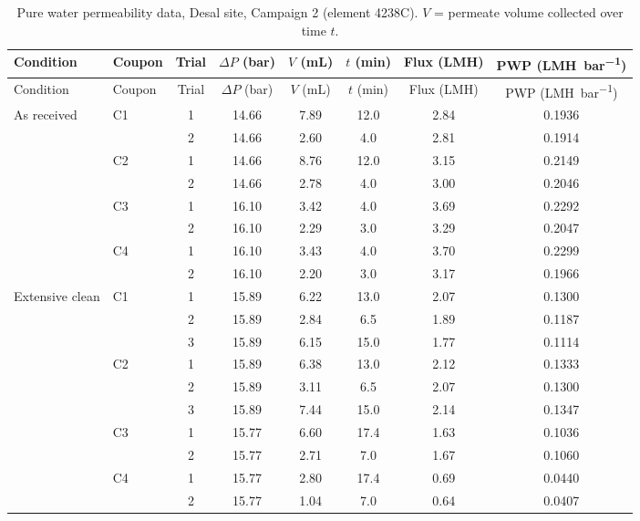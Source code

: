 {\footnotesize\setlength{\tabcolsep}{4pt}
\begin{longtable}{llcccccc}
  \caption{Pure water permeability data, Desal site, Campaign 2 (element 4238C). $V$ = permeate volume collected over time $t$.}
  \label{tab:app-c2-desal-pwp}\\
  \toprule
  Condition & Coupon & Trial & $\Delta P$ (\unit{bar}) & $V$ (\unit{mL}) & $t$ (\unit{min}) & Flux (\unit{LMH}) & PWP (\unit{LMH.bar^{-1}}) \\
  \midrule
  \endfirsthead
  \toprule
  Condition & Coupon & Trial & $\Delta P$ (\unit{bar}) & $V$ (\unit{mL}) & $t$ (\unit{min}) & Flux (\unit{LMH}) & PWP (\unit{LMH.bar^{-1}}) \\
  \midrule
  \endhead
    As received & C1 & 1 & 14.66 & 7.89 & 12.0 & 2.84 & 0.1936 \\
     &  & 2 & 14.66 & 2.60 & 4.0 & 2.81 & 0.1914 \\
    \addlinespace[2pt]
     & C2 & 1 & 14.66 & 8.76 & 12.0 & 3.15 & 0.2149 \\
     &  & 2 & 14.66 & 2.78 & 4.0 & 3.00 & 0.2046 \\
    \addlinespace[2pt]
     & C3 & 1 & 16.10 & 3.42 & 4.0 & 3.69 & 0.2292 \\
     &  & 2 & 16.10 & 2.29 & 3.0 & 3.29 & 0.2047 \\
    \addlinespace[2pt]
     & C4 & 1 & 16.10 & 3.43 & 4.0 & 3.70 & 0.2299 \\
     &  & 2 & 16.10 & 2.20 & 3.0 & 3.17 & 0.1966 \\
    \midrule
    Extensive clean & C1 & 1 & 15.89 & 6.22 & 13.0 & 2.07 & 0.1300 \\
     &  & 2 & 15.89 & 2.84 & 6.5 & 1.89 & 0.1187 \\
     &  & 3 & 15.89 & 6.15 & 15.0 & 1.77 & 0.1114 \\
    \addlinespace[2pt]
     & C2 & 1 & 15.89 & 6.38 & 13.0 & 2.12 & 0.1333 \\
     &  & 2 & 15.89 & 3.11 & 6.5 & 2.07 & 0.1300 \\
     &  & 3 & 15.89 & 7.44 & 15.0 & 2.14 & 0.1347 \\
    \addlinespace[2pt]
     & C3 & 1 & 15.77 & 6.60 & 17.4 & 1.63 & 0.1036 \\
     &  & 2 & 15.77 & 2.71 & 7.0 & 1.67 & 0.1060 \\
    \addlinespace[2pt]
     & C4 & 1 & 15.77 & 2.80 & 17.4 & 0.69 & 0.0440 \\
     &  & 2 & 15.77 & 1.04 & 7.0 & 0.64 & 0.0407 \\

\end{longtable}}
